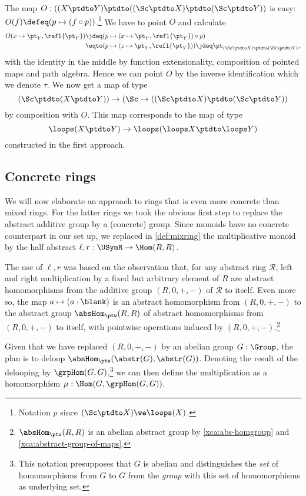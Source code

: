 \begin{remark}
The map $O: ((X\ptdto Y)\ptdto((\Sc\ptdto X)\ptdto(\Sc\ptdto Y))$
is easy: $O(f)\defeq (p\mapsto (f\circ p))$.\footnote{%
Notation $p$ since $(\Sc\ptdto X)\we\loops(X)$.}
We have to point $O$ and calculate 
\begin{align*}
O(x\mapsto\pt_Y,\refl{\pt_Y})
&\jdeq (p\mapsto(x\mapsto\pt_Y,\refl{\pt_Y})\circ p)\\
&\eqto (p\mapsto (z\mapsto\pt_Y,\refl{\pt_Y}))
 \jdeq\pt_{(\Sc\ptdto X)\ptdto(\Sc\ptdto Y)},
\end{align*}
with the identity in the middle by function extensionality,
composition of pointed maps and path algebra.
Hence we can point $O$ by the inverse identification which we denote $\tau$.
We now get a map of type 
$$(\Sc\ptdto(X\ptdto Y))\to(\Sc\to((\Sc\ptdto X)\ptdto(\Sc\ptdto Y))$$
by composition with $O$. This map corresponds to the map of type
$$\loops(X\ptdto Y) \to \loops(\loops X\ptdto \loops Y)$$
constructed in the first approach. 
\end{remark}


\subsection{Concrete rings}\label{sec:concrings}

We will now elaborate an approach to rings that is even more concrete
than mixed rings. For the latter rings we took the
obvious first step to replace the abstract additive group by a 
(concrete) group. Since monoids have no concrete counterpart in our set up,
we replaced in \cref{def:mixring} the multiplicative monoid 
by the half abstract $\ell,r:\USymR\to\Hom(R,R)$.

The use of $\ell,r$ was based on the observation that, 
for any abstract ring $\mathscr R$, left and right multiplication
by a fixed but arbitrary element of $R$ are 
abstract homomorphisms from the additive group $(R,0,+,-)$ of 
$\mathscr R$ to itself. 
Even more so, the map $a\mapsto(a\cdot\blank)$ is an abstract homomorphism
from $(R,0,+,-)$ to the abstract group $\absHom_{\ptw}(R,R)$
of abstract homomorphisms from $(R,0,+,-)$ to itself, with
pointwise operations induced by $(R,0,+,-)$.\footnote{%
$\absHom_{\ptw}(R,R)$ is an abelian abstract group by
\cref{xca:abs-homgroup} and \cref{xca:abstract-group-of-maps}.}

Given that we have replaced $(R,0,+,-)$ by an abelian group $G:\Group$,
the plan is to deloop $\absHom_{\ptw}(\abstr(G),\abstr(G))$. 
Denoting the result of the delooping by $\grpHom(G,G)$,\footnote{%
This notation presupposes that $G$ is abelian and distinguishes 
the \emph{set} of homomorphisms from $G$ to $G$ from the \emph{group}
with this set of homomorphisms as underlying set.}
we can then define the multiplication as a homomorphism
$\mu: \Hom(G,\grpHom(G,G))$.

